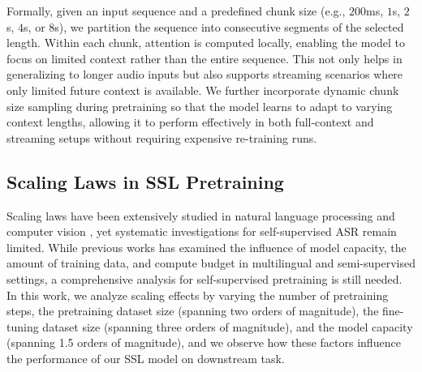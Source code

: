 \documentclass{Interspeech}
\begin{document}
Formally, given an input sequence
and a predefined chunk size (e.g., $200$ms, $1$s, $2$s, $4$s, or $8$s), we partition the sequence into consecutive segments of the selected length.
Within each chunk, attention is computed locally, enabling the model to focus on limited context rather than the entire sequence. This not only helps in generalizing to longer audio inputs but also supports streaming scenarios where only limited future context is available. We further incorporate dynamic chunk size sampling during pretraining so that the model learns to adapt to varying context lengths, allowing it to perform effectively in both full-context and streaming setups without requiring expensive re-training runs.

\subsection{Scaling Laws in SSL Pretraining}

Scaling laws have been extensively studied in natural language processing \cite{Kaplan2020, Hoffmann2022} and computer vision \cite{Dosovitskiy2021}, yet systematic investigations for self-supervised ASR remain limited. While previous works \cite{google_10b, fair_scaling, whisper} has examined the influence of model capacity, the amount of training data, and compute budget in multilingual and semi-supervised settings, a comprehensive analysis for self-supervised pretraining is still needed. In this work, we analyze scaling effects by varying the number of pretraining steps, the pretraining dataset size (spanning two orders of magnitude), the fine-tuning dataset size (spanning three orders of magnitude), and the model capacity (spanning 1.5 orders of magnitude), and we observe how these factors influence the performance of our SSL model on downstream task.



\end{document}
